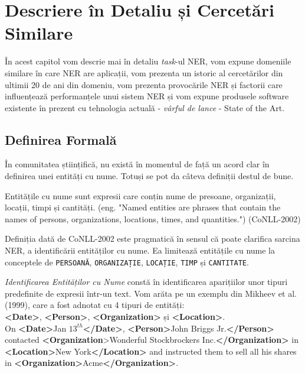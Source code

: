 \chapter{Descriere în Detaliu și Cercetări Similare}
\label{chapter:history}

În acest capitol vom descrie mai în detaliu \textit{task}-ul NER, vom expune domeniile similare în care NER are aplicații, vom prezenta un istoric al cercetărilor din ultimii 20 de ani din domeniu, vom prezenta provocările NER și factorii care influențează performanțele unui sistem NER și vom expune produsele software existente în prezent cu tehnologia actuală - \textit{vârful de lance} - State of the Art.

\section{Definirea Formală}

În comunitatea științifică, nu există în momentul de față un acord clar în definirea unei entități cu nume. Totuși se pot da câteva definiții destul de bune.

Entitățile cu nume sunt expresii care conțin nume de presoane, organizații, locații, timpi și cantități. (eng. "Named entities are phrases that contain the names of persons, organizations, locations, times, and quantities.") (CoNLL-2002)

Definiția dată de CoNLL-2002 este pragmatică în sensul că poate clarifica sarcina NER, a identificării entităților cu nume. Ea limitează entitățile cu nume la conceptele de \texttt{PERSOANĂ}, \texttt{ORGANIZAȚIE}, \texttt{LOCAȚIE}, \texttt{TIMP} și \texttt{CANTITATE}.


\textit{Identificarea Entităților cu Nume} constă în identificarea aparițiilor unor tipuri predefinite de expresii într-un text. Vom arăta pe un exemplu din Mikheev et al. (1999)\cite{mikheev1999}, care a fost adnotat cu 4 tipuri de entități:\\

\textbf{<Date>}, \textbf{<Person>}, \textbf{<Organization>} și \textbf{<Location>}.\\


On \textbf{<Date>}Jan $13^{th}$\textbf{</Date>}, \textbf{<Person>}John Briggs Jr.\textbf{</Person>} contacted
\textbf{<Organization}>Wonderful Stockbrockers Inc.\textbf{</Organization>} in\textbf{ <Location>}New
York\textbf{</Location>} and instructed them to sell all his shares in
\textbf{<Organization>}Acme\textbf{</Organization>}.\\


